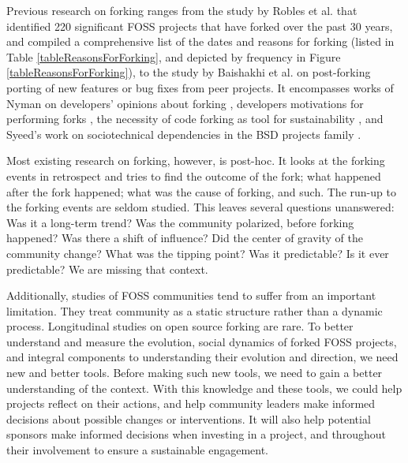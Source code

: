 \documentclass[11pt]{report}
\begin{document}
Previous research on forking ranges from the study by Robles et al. \cite{Robles} that identified 220 significant FOSS projects that have forked over the past 30 years, and compiled a comprehensive list of the dates and reasons for forking (listed in Table \ref{tableReasonsForForking}, and depicted by frequency in Figure \ref{tableReasonsForForking}), to the study by Baishakhi et al. \cite{Baishakhi} on post-forking porting of new features or bug fixes from peer projects. It encompasses works of Nyman on developers' opinions about forking \cite{NymanHackersForking}, developers motivations for performing forks \cite{NymanToForkOrNotToFork}, the necessity of code forking as tool for sustainability \cite{NymanForkingSustainability}, and Syeed's work on sociotechnical dependencies in the BSD projects family \cite{Syeed}.

Most existing research on forking, however, is post-hoc. It looks at the forking events in retrospect and tries to find the outcome of the fork; what happened after the fork happened; what was the cause of forking, and such. The run-up to the forking events are seldom studied. This leaves several questions unanswered: Was it a long-term trend? Was the community polarized, before forking happened? Was there a shift of influence? Did the center of gravity of the community change? What was the tipping point? Was it predictable? Is it ever predictable? We are missing that context. 

Additionally, studies of FOSS communities tend to suffer from an important limitation. They treat community as a static structure rather than a dynamic process. Longitudinal studies on open source forking are rare. To better understand and measure the evolution, social dynamics of forked FOSS projects, and integral components to understanding their evolution and direction, we need new and better tools. Before making such new tools, we need to gain a better understanding of the context. With this knowledge and these tools, we could help projects reflect on their actions, and help community leaders make informed decisions about possible changes or interventions. It will also help potential sponsors make informed decisions when investing in a project, and throughout their involvement to ensure a sustainable engagement. 
\end{document}
